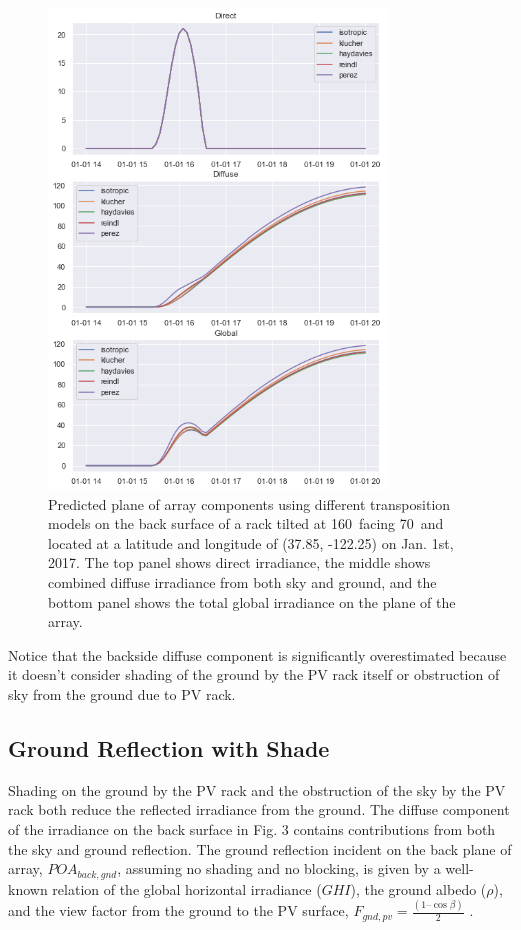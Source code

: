 \documentclass[conference]{IEEEtran}
\begin{document}
\begin{figure}
\centering
\includegraphics[width=9cm]{backside_transposition.png}
\caption{Predicted plane of array components using different transposition models on the back surface of a rack tilted at 160\degree\ facing 70\degree\ and located at a latitude and longitude of (37.85\degree, -122.25\degree) on Jan. 1st, 2017.  The top panel shows direct irradiance, the middle shows combined diffuse irradiance from both sky and ground, and the bottom panel shows the total global irradiance on the plane of the array.}
\end{figure}

Notice that the backside diffuse component is significantly overestimated because it doesn’t consider shading of the ground by the PV rack itself or obstruction of sky from the ground due to PV rack.

\subsection{ Ground Reflection with Shade }
Shading on the ground by the PV rack and the obstruction of the sky by the PV rack both reduce the reflected irradiance from the ground.  The diffuse component of the irradiance on the back surface in Fig. 3 contains contributions from both the sky and ground reflection.  The ground reflection incident on the back plane of array, $POA_{back,gnd}$, assuming no shading and no blocking, is given by a well-known relation of the global horizontal irradiance ($GHI$), the ground albedo ($\rho$), and the view factor from the ground to the PV surface, $F_{gnd,pv} = \frac{\left(1 – \cos\beta\right)}{2}$ \cite{Marion2017}.
\end{document}
